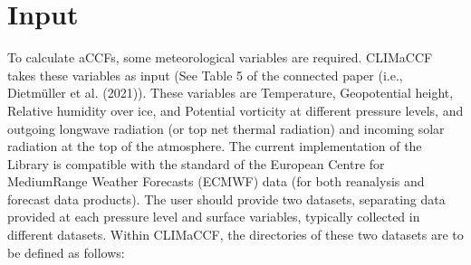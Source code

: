\documentclass[a4paper,11pt,english]{sphinxmanual}
\begin{document}
\section{Input}
\label{\detokenize{gStarted:input}}
\sphinxAtStartPar
To calculate aCCFs, some meteorological variables are required. CLIMaCCF takes these variables as input (See Table 5 of the connected paper (i.e., Dietmüller et al. (2021)).
These variables are Temperature, Geopotential height, Relative humidity over ice, and Potential vorticity at different pressure levels,
and outgoing longwave radiation (or top net thermal radiation) and incoming solar radiation at the top of the atmosphere.
The current implementation of the Library is compatible with the standard of the European Centre for Medium\sphinxhyphen{}Range Weather Forecasts (ECMWF) data (for both reanalysis and forecast data products).
The user should provide two datasets, separating data provided at each pressure level and surface variables, typically collected in different datasets. Within CLIMaCCF, the directories of these two datasets are to be defined as follows:

\begin{sphinxVerbatim}[commandchars=\\\{\}]
  
\PYG{p}{[}\PYG{p}{]}     
\PYG{p}{[}\PYG{p}{]}     
\end{sphinxVerbatim}
\end{document}
